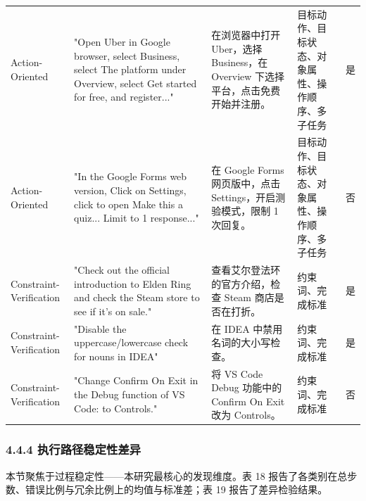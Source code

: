\documentclass[12pt,a4paper,openany,oneside]{ctexrep}
\begin{document}
\begin{table}[htbp]
{\begin{tabular}{l l l l l}
Action-Oriented & "Open Uber in Google browser, select Business, select The platform under Overview, select Get started for free, and register..." & 在浏览器中打开 Uber，选择 Business，在 Overview 下选择平台，点击免费开始并注册。 & 目标动作、目标状态、对象属性、操作顺序、多子任务 & 是 \\
Action-Oriented & "In the Google Forms web version, Click on Settings, click to open Make this a quiz... Limit to 1 response..." & 在 Google Forms 网页版中，点击 Settings，开启测验模式，限制 1 次回复。 & 目标动作、目标状态、对象属性、操作顺序、多子任务 & 否 \\
Constraint-Verification & "Check out the official introduction to Elden Ring and check the Steam store to see if it's on sale." & 查看艾尔登法环的官方介绍，检查 Steam 商店是否在打折。 & 约束词、完成标准 & 是 \\
Constraint-Verification & "Disable the uppercase/lowercase check for nouns in IDEA" & 在 IDEA 中禁用名词的大小写检查。 & 约束词、完成标准 & 是 \\
Constraint-Verification & "Change Confirm On Exit in the Debug function of VS Code: to Controls." & 将 VS Code Debug 功能中的 Confirm On Exit 改为 Controls。 & 约束词、完成标准 & 否 \\
\bottomrule
\end{tabular}
}
\end{table}

\subsubsection{4.4.4 执行路径稳定性差异}


本节聚焦于过程稳定性——本研究最核心的发现维度。表 18 报告了各类别在总步数、错误比例与冗余比例上的均值与标准差；表 19 报告了差异检验结果。


\begin{table}[htbp]
\centering
\caption{表 18：各类别过程性结果指标描述统计}
\small
{}
\end{table}
\end{document}
